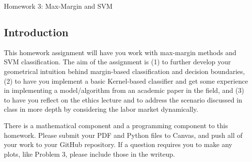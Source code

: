 \documentclass[submit]{harvardml}
\begin{document}
\begin{center}
{\Large Homework 3: Max-Margin and SVM}\\
\end{center}
\subsection*{Introduction}

This homework assignment will have you work with max-margin methods
and SVM classification. The aim of the assignment is (1) to further
develop your geometrical intuition behind margin-based classification
and decision boundaries, (2) to have you implement a basic Kernel-based
classifier and get some experience in implementing a model/algorithm 
from an academic paper in the field, and (3) to have you reflect on the
ethics lecture and to address the scenario discussed in class
in more depth by considering the labor market dynamically.

There is a mathematical component and a programming component to this
homework.  Please submit your PDF and Python files to Canvas, and push
all of your work to your GitHub repository. If a question requires you
to make any plots, like Problem 3, please include those in the
writeup.
\end{document}
